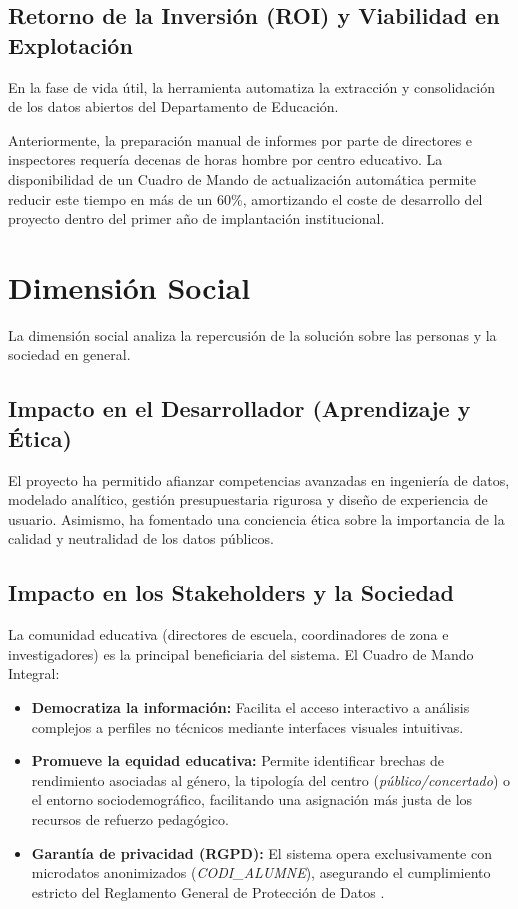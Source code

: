\documentclass[12pt, a4paper, twoside]{report}
\begin{document}
\subsection{Retorno de la Inversión (ROI) y Viabilidad en Explotación}
En la fase de vida útil, la herramienta automatiza la extracción y consolidación de los datos abiertos del Departamento de Educación. 

Anteriormente, la preparación manual de informes por parte de directores e inspectores requería decenas de horas hombre por centro educativo. La disponibilidad de un Cuadro de Mando de actualización automática permite reducir este tiempo en más de un 60\%, amortizando el coste de desarrollo del proyecto dentro del primer año de implantación institucional.

\section{Dimensión Social}
La dimensión social analiza la repercusión de la solución sobre las personas y la sociedad en general.

\subsection{Impacto en el Desarrollador (Aprendizaje y Ética)}
El proyecto ha permitido afianzar competencias avanzadas en ingeniería de datos, modelado analítico, gestión presupuestaria rigurosa y diseño de experiencia de usuario. Asimismo, ha fomentado una conciencia ética sobre la importancia de la calidad y neutralidad de los datos públicos.

\subsection{Impacto en los Stakeholders y la Sociedad}
La comunidad educativa (directores de escuela, coordinadores de zona e investigadores) es la principal beneficiaria del sistema. El Cuadro de Mando Integral:
\begin{itemize}
    \item \textbf{Democratiza la información:} Facilita el acceso interactivo a análisis complejos a perfiles no técnicos mediante interfaces visuales intuitivas.
    \item \textbf{Promueve la equidad educativa:} Permite identificar brechas de rendimiento asociadas al género, la tipología del centro (\textit{público/concertado}) o el entorno sociodemográfico, facilitando una asignación más justa de los recursos de refuerzo pedagógico.
    \item \textbf{Garantía de privacidad (RGPD):} El sistema opera exclusivamente con microdatos anonimizados (\textit{CODI\_ALUMNE}), asegurando el cumplimiento estricto del Reglamento General de Protección de Datos \cite{transparencia_catalunya_2024}.
\end{itemize}


\clearpage


\end{document}
